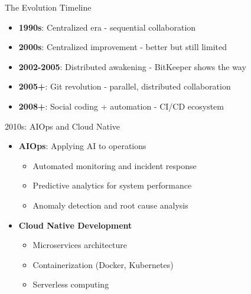 \documentclass{beamer}
\begin{document}
\begin{frame}{The Evolution Timeline}
\begin{center}
\end{center}

\begin{itemize}
    \item \textbf{1990s}: Centralized era - sequential collaboration
    \item \textbf{2000s}: Centralized improvement - better but still limited
    \item \textbf{2002-2005}: Distributed awakening - BitKeeper shows the way
    \item \textbf{2005+}: Git revolution - parallel, distributed collaboration
    \item \textbf{2008+}: Social coding + automation - CI/CD ecosystem
\end{itemize}
\end{frame}

\begin{frame}[t]{2010s: AIOps and Cloud Native}
\begin{itemize}
    \item \textbf{AIOps}: Applying AI to operations
    \begin{itemize}
        \item Automated monitoring and incident response
        \item Predictive analytics for system performance
        \item Anomaly detection and root cause analysis
    \end{itemize}
    \item \textbf{Cloud Native Development}
    \begin{itemize}
        \item Microservices architecture
        \item Containerization (Docker, Kubernetes)
        \item Serverless computing
    \end{itemize}
\end{itemize}
\begin{center}
\end{center}
\end{frame}
\end{document}
